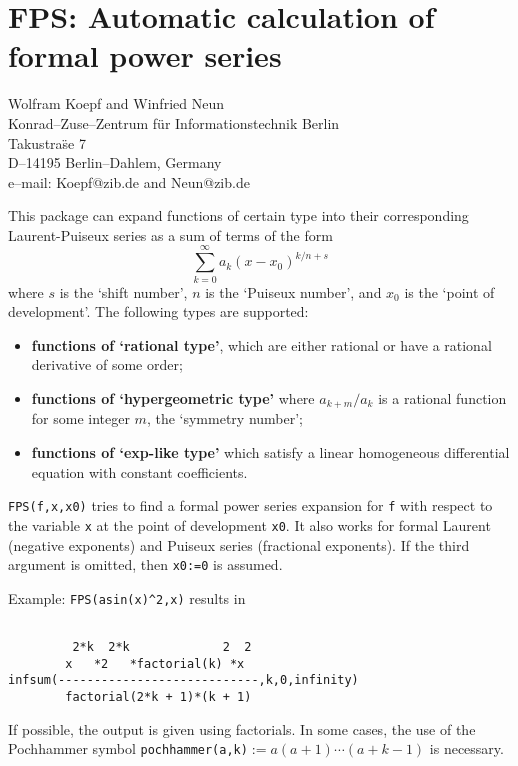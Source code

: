 \chapter[FPS: Formal power series]%
        {FPS: Automatic calculation of formal power series}
\label{FPS}

{\footnotesize
\begin{center}
Wolfram Koepf and Winfried Neun\\
Konrad--Zuse--Zentrum f\"ur Informationstechnik Berlin \\
Takustra\"se 7 \\
D--14195 Berlin--Dahlem, Germany \\[0.05in]
e--mail: Koepf@zib.de and Neun@zib.de
\end{center}
}


This package can expand functions of certain type into
their corresponding Laurent-Puiseux series as a sum of terms of the form
\begin{displaymath}
\sum_{k=0}^{\infty} a_{k} (x-x_{0})^{k/n + s}
\end{displaymath}
where $s$ is the `shift number', $n$ is the `Puiseux number',
and $x_0$ is the `point of development'. The following types are
supported:
\begin{itemize}
\item
{\bf functions of `rational type'}, which are either rational or have a
rational derivative of some order;
\item
{\bf functions of `hypergeometric type'} where $a_{k+m}/a_k$ is a rational
function for some integer $m$, the `symmetry number';
\item
{\bf functions of `exp-like type'} which satisfy a linear homogeneous
differential equation with constant coefficients.
\end{itemize}

{\tt FPS(f,x,x0)} tries to find a formal power
series expansion for {\tt f} with respect to the variable {\tt x}
at the point of development {\tt x0}.
It also works for formal Laurent (negative exponents) and Puiseux series
(fractional exponents). If the third
argument is omitted, then {\tt x0:=0} is assumed.

Example: {\tt FPS(asin(x)\verb+^+2,x)} results in
\begin{verbatim}

         2*k  2*k             2  2
        x   *2   *factorial(k) *x
infsum(----------------------------,k,0,infinity)
        factorial(2*k + 1)*(k + 1)
\end{verbatim}
If possible, the output is given using factorials. In some cases, the
use of the Pochhammer symbol {\tt pochhammer(a,k)}$:=a(a+1)\cdots(a+k-1)$
is necessary.

